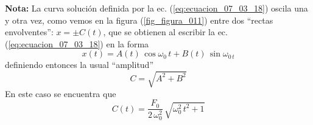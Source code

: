 \textbf{Nota:} La curva solución definida por la ec. (\ref{eq:ecuacion_07_03_18}) oscila una y otra vez, como vemos en la figura (\ref{fig_figura_011}) entre dos \enquote{rectas envolventes}: $x = \pm C(t)$, que se obtienen al escribir la ec. (\ref{eq:ecuacion_07_03_18}) en la forma
\[ x(t) =  A(t) \, \cos \omega_{0} \, t +  B(t) \, \sin \omega_{0 \, t} \]
definiendo entonces la usual \enquote{amplitud}
\[ C = \sqrt{A^{2} +  B^{2}} \]
En este caso se encuentra que
\[ C(t) = \dfrac{F_{0}}{2 \, \omega_{0}^{2}} \, \sqrt{\omega_{0}^{2} \, t^{2} + 1} \]
